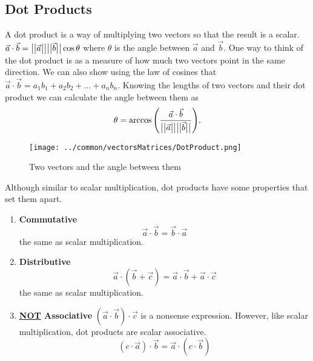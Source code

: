 \subsection{Dot Products}
\noindent
A dot product is a way of multiplying two vectors so that the result is a scalar.
$\vec{a}\cdot\vec{b} = \big\lvert \big\lvert \vec{a} \big\rvert \big\rvert\big\lvert \big\lvert \vec{b} \big\rvert \big\rvert\cos{\theta}$ where $\theta$ is the angle between $\vec{a}$ and $\vec{b}$.
One way to think of the dot product is as a measure of how much two vectors point in the same direction.
We can also show using the law of cosines that $\vec{a}\cdot\vec{b} = a_1b_1+a_2b_2+...+a_nb_n$.
Knowing the lengths of two vectors and their dot product we can calculate the angle between them as
\begin{equation*}
	\theta = \arccos{\left(\frac{\vec{a} \cdot \vec{b}}{\big\lvert \big\lvert \vec{a} \big\rvert \big\rvert \big\lvert \big\lvert \vec{b} \big\rvert \big\rvert}\right)}.
\end{equation*}

\begin{figure}[H]
	\centering
	\texttt{[image: ../common/vectorsMatrices/DotProduct.png]}
	\caption{Two vectors and the angle between them}
\end{figure}

\noindent
Although similar to scalar multiplication, dot products have some properties that set them apart.
\begin{enumerate}[label=]
	\item \textbf{Commutative}
		\begin{equation*}
			\vec{a}\cdot\vec{b} = \vec{b}\cdot\vec{a}
		\end{equation*}
		the same as scalar multiplication.
	\item \textbf{Distributive}
		\begin{equation*}
			\vec{a}\cdot\left(\vec{b}+\vec{c}\right) = \vec{a}\cdot\vec{b}+\vec{a}\cdot\vec{c}
		\end{equation*}
		the same as scalar multiplication.
	\item \textbf{\underline{NOT} Associative}
		$\left(\vec{a}\cdot\vec{b}\right)\cdot\vec{c}$ is a nonsense expression.
		However, like scalar multiplication, dot products are scalar associative.
		\begin{equation*}
			\left(c\cdot\vec{a}\right)\cdot\vec{b} = \vec{a}\cdot\left(c\cdot\vec{b}\right)
		\end{equation*}
\end{enumerate}